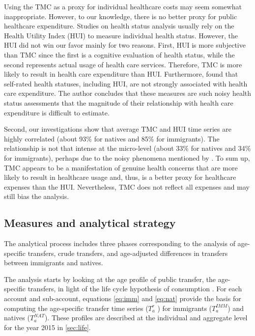 \vspace{0.7em}\par
Using the TMC as a proxy for individual healthcare costs may seem somewhat inappropriate.
However, to our knowledge, there is no better proxy for public healthcare expenditure.
Studies on health status analysis usually rely on the Health Utility Index (HUI) to measure individual health status.
However, the HUI did not win our favor mainly for two reasons.
First, HUI is more subjective than TMC since the first is a cognitive evaluation of health status, while the second represents actual usage of health care services.
Therefore, TMC is more likely to result in health care expenditure than HUI. Furthermore, \citet{Pierard:2016ik} found that self-rated health statuses, including HUI, are not strongly associated with health care expenditure.
The author concludes that these measures are such noisy health status assessments that the magnitude of their relationship with health care expenditure is difficult to estimate.

\vspace{0.7em}\par
Second, our investigations show that average TMC and HUI time series are highly correlated (about 93\% for natives and 85\% for immigrants).
The relationship is not that intense at the micro-level (about 33\% for natives and 34\% for immigrants), perhaps due to the noisy phenomena mentioned by \citet{Pierard:2016ik}.
To sum up, TMC appears to be a manifestation of genuine health concerns that are more likely to result in healthcare usage and, thus, is a better proxy for healthcare expenses than the HUI. Nevertheless, TMC does not reflect all expenses and may still bias the analysis.

\subsection{Measures and analytical strategy}

The analytical process includes three phases corresponding to the analysis of age-specific transfers, crude transfers, and age-adjusted differences in transfers between immigrants and natives.

\vspace{0.7em}\par
The analysis starts by looking at the age profile of public transfer, the age-specific transfers, in light of the life cycle hypothesis of consumption \citep{andoLifeCycleHypothesis1963,Deaton:2005vr}.
For each account and sub-account, equations \eqref{eq:imm} and \eqref{eq:nat} provide the basis for computing the age-specific transfer time series (\( T^{r}_a \) ) for immigrants (\(T^{IMM}_a\)) and natives (\( T^{NAT}_a \)).
These profiles are described at the individual and aggregate level for the year 2015 in \autoref{sec:life}.

